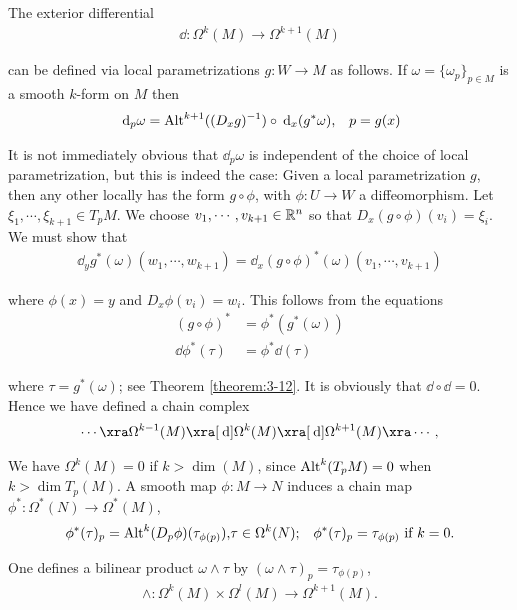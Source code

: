 The exterior differential 
\begin{align*}
  \dd:\Omega^k(M) \to\Omega^{k+1}(M)
\end{align*}

can be defined via local parametrizations $g:W\to M$ as follows. If $\omega=\{\omega_p\}_{p\in M}$
is a smooth $k$-form on $M$ then
\begin{align}
  \dd_p\omega = \alt^{k+1}((D_xg)^{-1})\circ \dd_x(g^*\omega), 
  && p = g(x)
\end{align}

It is not immediately obvious that $\dd_p\omega$ is independent of the choice of local
parametrization, but this is indeed the case: Given a local parametrization $g$, then
any other locally has the form $g\circ\phi$, with $\phi:U\to W$ a diffeomorphism. Let
$\xi_1, \cdots, \xi_{k+1}\in T_pM$. We choose $v_1, \cdots, v_{k+1}\in\mathbb{R}^n$ so that 
$D_x(g\circ \phi)(v_i) = \xi_i$. We must show that
\begin{align*}
  \dd_yg^*(\omega)(w_1, \cdots, w_{k+1})
  = \dd_x(g\circ \phi)^*(\omega)(v_1, \cdots, v_{k+1})
\end{align*}

where $\phi(x)= y$ and $D_x\phi(v_i) = w_i$. This follows from the equations 
\begin{align*}
  (g\circ \phi)^* & = \phi^*(g^*(\omega)) \\
  \dd\phi^*(\tau) & = \phi^*\dd(\tau)
\end{align*}

where $\tau = g^*(\omega)$; see Theorem \ref{theorem:3-12}. It is obviously that $\dd\circ\dd = 0$.
Hence we have defined a chain complex
\begin{align*}
  \cdots \xra \Omega^{k-1}(M) \xra[\dd]\Omega^k(M)\xra[\dd]\Omega^{k+1}(M)\xra \cdots,
\end{align*}

We have $\Omega^k(M) = 0$ if $k>\dim(M)$, since $\operatorname{Alt}^k(T_pM) = 0$ when $k>\dim T_p(M)$. A smooth
map $\phi:M\to N$ induces a chain map $\phi^*:\Omega^*(N)\to \Omega^*(M)$, 
\begin{align}
  \phi^*(\tau)_p 
  = \operatorname{Alt}^k(D_p\phi)(\tau_{\phi(p)}), 
  & \tau\in \Omega^k(N);
  & \phi^*(\tau)_p = \tau_{\phi(p)} \text{ if } k=0. 
\end{align}

One defines a bilinear product $\omega\wedge\tau$ by $(\omega\wedge\tau)_p = \tau_{\phi(p)}$,
\begin{align}
  \wedge:\Omega^k(M)\times\Omega^l(M)\to \Omega^{k+1}(M).
\end{align}

